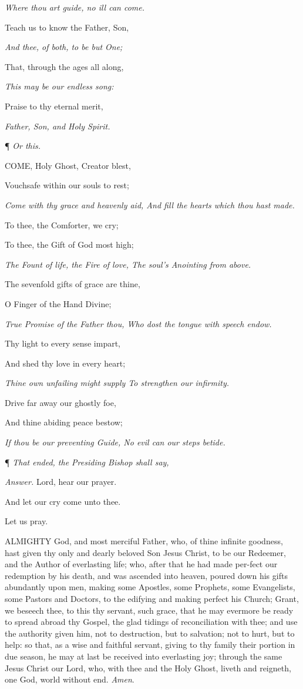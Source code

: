 \emph{Where thou art guide, no ill can come.}

Teach
us to know the Father, Son, 

\emph{And thee, of both, to be but One;}

That, through the ages all along, 

\emph{This may be our endless song:}

Praise to thy eternal merit, 

\emph{Father, Son, and Holy Spirit.}

¶
\emph{Or this.}

COME,
Holy Ghost, Creator blest, 

Vouchsafe within our souls to rest; 

\emph{Come with thy grace and heavenly aid, And fill the hearts which thou hast made.}

To thee,
the Comforter, we cry;

To thee, the Gift of God most high; 

\emph{The Fount of life, the Fire of love, The soul's Anointing from above.}

The
sevenfold gifts of grace are thine, 

O Finger of the Hand Divine; 

\emph{True Promise of the Father thou, Who dost the tongue with speech endow.}

Thy
light to every sense impart, 

And shed thy love in every heart; 

\emph{Thine own unfailing might supply To strengthen our infirmity.}

Drive
far away our ghostly foe, 

And thine abiding peace bestow; 

\emph{If thou be our preventing Guide, No evil can our steps betide.}

¶
\emph{That ended, the Presiding Bishop shall say,}

\emph{Answer.} Lord,
hear our prayer.

And let our cry come unto thee.

Let us
pray.

ALMIGHTY
God, and most merciful Father, who, of thine infinite goodness, hast given
thy only and dearly beloved Son Jesus Christ, to be our Redeemer, and
the Author of everlasting life; who, after that he had made per-fect our
redemption by his death, and was ascended into heaven, poured down his
gifts abundantly upon men, making some Apostles, some Prophets, some Evangelists,
some Pastors and Doctors, to the edifying and making perfect his Church;
Grant, we beseech thee, to this thy servant, such grace, that he may evermore
be ready to spread abroad thy Gospel, the glad tidings of reconciliation
withthee; and use the authority given him, not to destruction, but to
salvation; not to hurt, but to help: so that, as a wise and faithful servant,
giving to thy family their portion in due season, he may at last be received
into everlasting joy; through the same Jesus Christ our Lord, who, with
thee and the Holy Ghost, liveth and reigneth, one God, world without end.
\emph{Amen}.

